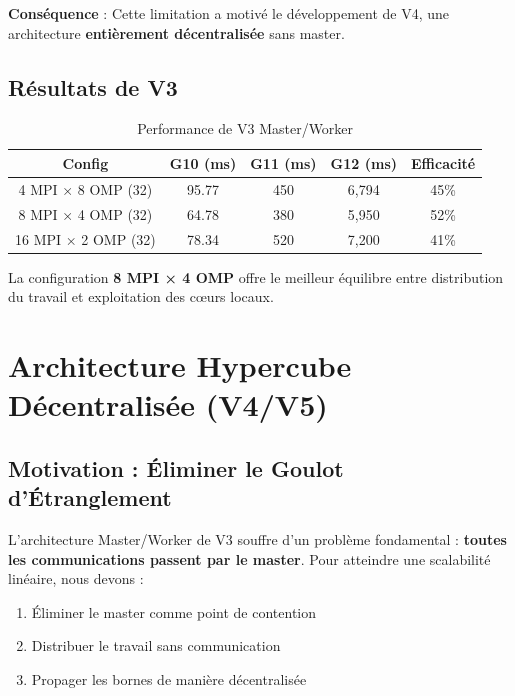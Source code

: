 \documentclass[12pt,a4paper,twoside]{report}
\begin{document}
\textbf{Conséquence} : Cette limitation a motivé le développement de V4, une architecture \textbf{entièrement décentralisée} sans master.

\section{Résultats de V3}

\begin{table}[htbp]
\centering
\caption{Performance de V3 Master/Worker}
\label{tab:v3-perf}
\begin{tabular}{@{}ccccc@{}}
\toprule
\textbf{Config} & \textbf{G10 (ms)} & \textbf{G11 (ms)} & \textbf{G12 (ms)} & \textbf{Efficacité} \\
\midrule
4 MPI × 8 OMP (32) & 95.77 & 450 & 6,794 & 45\% \\
8 MPI × 4 OMP (32) & 64.78 & 380 & 5,950 & 52\% \\
16 MPI × 2 OMP (32) & 78.34 & 520 & 7,200 & 41\% \\
\bottomrule
\end{tabular}
\end{table}

La configuration \textbf{8 MPI × 4 OMP} offre le meilleur équilibre entre distribution du travail et exploitation des cœurs locaux.


\chapter{Architecture Hypercube Décentralisée (V4/V5)}

\section{Motivation : Éliminer le Goulot d'Étranglement}

L'architecture Master/Worker de V3 souffre d'un problème fondamental : \textbf{toutes les communications passent par le master}. Pour atteindre une scalabilité linéaire, nous devons :

\begin{enumerate}
    \item Éliminer le master comme point de contention
    \item Distribuer le travail sans communication
    \item Propager les bornes de manière décentralisée
\end{enumerate}
\end{document}
